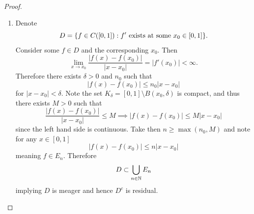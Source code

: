 \documentclass[hw_all.tex]{subfiles}
\begin{document}
\begin{proof}
\begin{enumerate}
        \item 
            Denote
            \[
                D = \qty{ f \in C([0,1]) : f' \text{ exists at some } x_0 \in [0,1] }
            .\]
            Consider some $f \in D$ and the corresponding $x_0$. Then
            \[
                \lim_{x \to x_0} \frac{|f(x) - f(x_0)|}{|x - x_0|} = |f'(x_0)| < \infty
            .\]
            Therefore there exists $\delta > 0$ and $n_0$ such that
            \[
                |f(x) - f(x_0)| \leq n_0 |x - x_0|
            \]
            for $|x - x_0| < \delta$. Note the set $K_{\delta} = [0,1] \setminus B(x_0, \delta)$ is compact, and thus there exists $M > 0$ such that
            \[
                \frac{|f(x) - f(x_0)|}{|x - x_0|} \leq M \implies |f(x) - f(x_0)| \leq M |x - x_0|
            \]
            since the left hand side is continuous. Take then $n \geq \max(n_0, M)$ and note for any $x \in [0,1]$
            \[
                |f(x) - f(x_0)| \leq n |x-x_0|
            \]
            meaning $f \in E_n$. Therefore
            \[
                D \subset \bigcup_{n \in \mathbb{N}} E_n
            \]
            implying $D$ is meager and hence $D^c$ is residual.
    \end{enumerate}
\end{proof}
\end{document}
